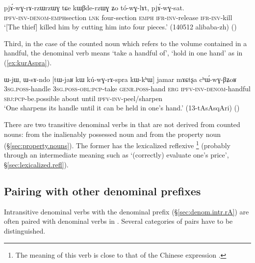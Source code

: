 \begin{exe}
\ex \label{ex:pjArwGrzWrzWG}
 \gll  pjɤ́-wɣ-rɤ-rzɯ\redp{}rzɯɣ tɕe kɯβde-rzɯɣ ʑo tó-wɣ-lɤt, pjɤ́-wɣ-sat. \\
 \textsc{ipfv}-\textsc{inv}-\textsc{denom}-\textsc{emph}\redp{}section \textsc{lnk} four-section \textsc{emph} \textsc{ifr}-\textsc{inv}-release \textsc{ifr}-\textsc{inv}-kill \\
 \glt `[The thief] killed him by cutting him into four pieces.'  (140512 alibaba-zh) 
 ()
\end{exe}

Third, in the case of the counted noun  which refers to the volume contained in a handful, the denominal verb means `take a handful of', `hold in one hand' as in (\ref{ex:kurAspra}).

\begin{exe}
\ex \label{ex:kurAspra}
 \gll ɯ-jɯ, ɯ-sɤ-ndo [tɯ-jaʁ kɯ kú-wɣ-rɤ-spra kɯ-kʰɯ] jamar mɤɕtʂa cʰɯ́-wɣ-βʑoʁ \\
 \textsc{3sg}.\textsc{poss}-handle \textsc{3sg}.\textsc{poss}-\textsc{obl}:\textsc{pcp}-take \textsc{genr}.\textsc{poss}-hand \textsc{erg} \textsc{ipfv}-\textsc{inv}-\textsc{denom}-handful \textsc{sbj}:\textsc{pcp}-be.possible about until \textsc{ipfv}-\textsc{inv}-peel/sharpen \\
\glt `One sharpens its handle until it can be held in one's hand.' (13-tAsAsqAri)
()
\end{exe}


There are two transitive denominal verbs in  that are not derived from counted nouns:  from the inalienably possessed noun  and  from the property noun  (§\ref{sec:property.nouns}).  The former has the lexicalized reflexive \footnote{The meaning of this verb is close to that of the Chinese expression .} (probably through an intermediate meaning such as `(correctly) evaluate one's price', §\ref{sec:lexicalized.refl}).


\subsection{Pairing with other denominal prefixes}  \label{sec:denom.rA.pairing}
Intransitive denominal verbs with the  denominal prefix (§\ref{sec:denom.intr.rA}) are often paired with denominal verbs in .  Several categories of  pairs have to be distinguished.

